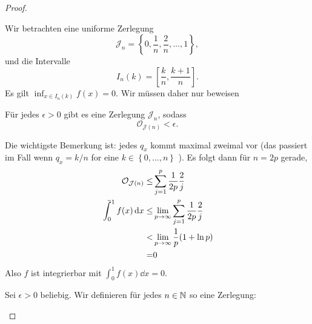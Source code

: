 \begin{proof}
	\begin{parts}
	\item Wir betrachten eine uniforme Zerlegung
		\[
		\mathcal{J}_n=\left\{ 0,\frac{1}{n},\frac{2}{n},\dots, 1 \right\} 
		,\]
		und die Intervalle 
		\[
		I_n(k)=\left[ \frac{k}{n},\frac{k+1}{n} \right] 
		.\] 
		Es gilt $\inf_{x\in I_n(k)}f(x)=0$. Wir müssen daher nur beweisen
		\begin{tcolorbox}[title=Ziel]
			 F\"{u}r jedes $\epsilon>0$ gibt es eine Zerlegung $\mathcal{J}_n$, sodass
			 \[
				 \mathcal{O}_{\mathcal{J}(n)}<\epsilon
			 .\] 
		\end{tcolorbox}
		Die wichtigste Bemerkung ist: jedes $q_x$ kommt maximal zweimal vor (das passiert im Fall wenn $q_x=k / n$ for eine $k\in \left\{ 0,\dots,n \right\} $ ). Es folgt dann f\"{u}r  $n=2p$ gerade,
		\begin{align*}
			\mathcal{O}_{\mathcal{J}(n)}\le&\sum_{j=1}^{p} \frac{1}{2p}\frac{2}{j}\\
\mathchoice%
    {\mkern13mu\overline{\vphantom{\intop}\mkern7mu}\mkern-20mu}%
    {\mkern7mu\overline{\vphantom{\intop}\mkern7mu}\mkern-14mu}%
    {\mkern7mu\overline{\vphantom{\intop}\mkern7mu}\mkern-14mu}%
    {\mkern7mu\overline{\vphantom{\intop}\mkern7mu}\mkern-14mu}%
  \int_0^1 f(x)\dd{x}\le&\lim_{p \to \infty} \sum_{j=1}^{p} \frac{1}{2p}\frac{2}{j}\\
			<&\lim_{p \to \infty} \frac{1}{p}(1+\ln p)\\
			=&0
		\end{align*}
		Also $f$ ist integrierbar mit $\int_0^1 f(x)\dd{x}=0$.
	\item Sei $\epsilon>0$ beliebig. Wir definieren f\"{u}r jedes $n\in \mathbb{N}$ so eine Zerlegung:


\end{parts}
\end{proof}
